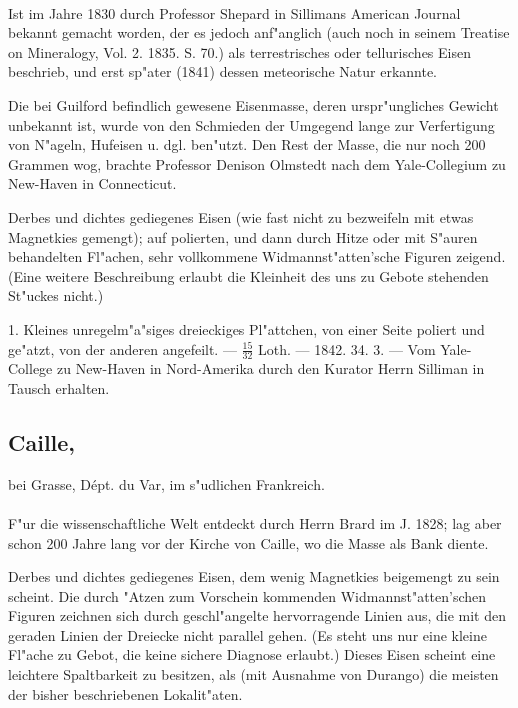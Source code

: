 \documentclass[a4paper, 11pt, oneside, polutonikogreek, german]{article}
\begin{document}
\paragraph{}
Ist im Jahre 1830 durch Professor Shepard in Sillimans American Journal bekannt gemacht worden, der es jedoch anf"anglich (auch noch in seinem Treatise on Mineralogy, Vol. 2. 1835. S. 70.) als terrestrisches oder tellurisches Eisen beschrieb, und erst sp"ater (1841) dessen meteorische Natur erkannte.

Die bei Guilford befindlich gewesene Eisenmasse, deren urspr"ungliches Gewicht unbekannt ist, wurde von den Schmieden der Umgegend lange zur Verfertigung von N"ageln, Hufeisen u. dgl. ben"utzt. Den Rest der Masse, die nur noch 200 Grammen wog, brachte Professor Denison Olmstedt nach dem Yale-Collegium zu New-Haven in Connecticut.

Derbes und dichtes gediegenes Eisen (wie fast nicht zu bezweifeln mit etwas Magnetkies gemengt); auf polierten, und dann durch Hitze oder mit S"auren behandelten Fl"achen, sehr vollkommene Widmannst"atten'sche Figuren zeigend. (Eine weitere Beschreibung erlaubt die Kleinheit des uns zu Gebote stehenden St"uckes nicht.)

1. Kleines unregelm"a"siges dreieckiges Pl"attchen, von einer Seite poliert und ge"atzt, von der anderen angefeilt. --- $\frac{15}{32}$ Loth. --- 1842. 34. 3. --- Vom Yale-College zu New-Haven in Nord-Amerika durch den Kurator Herrn Silliman in Tausch erhalten.
\subsection[Caille.]{Caille,}
\begin{center}
\small
bei Grasse, Dépt. du Var, im s"udlichen Frankreich.
\end{center}
\paragraph{}
F"ur die wissenschaftliche Welt entdeckt durch Herrn Brard im J. 1828; lag aber schon 200 Jahre lang vor der Kirche von Caille, wo die Masse als Bank diente.

Derbes und dichtes gediegenes Eisen, dem wenig Magnetkies beigemengt zu sein scheint. Die durch "Atzen zum Vorschein kommenden Widmannst"atten'schen Figuren zeichnen sich durch geschl"angelte hervorragende Linien aus, die mit den geraden Linien der Dreiecke nicht parallel gehen. (Es steht uns nur eine kleine Fl"ache zu Gebot, die keine sichere Diagnose erlaubt.) Dieses Eisen scheint eine leichtere Spaltbarkeit zu besitzen, als (mit Ausnahme von Durango) die meisten der bisher beschriebenen Lokalit"aten.
\end{document}

